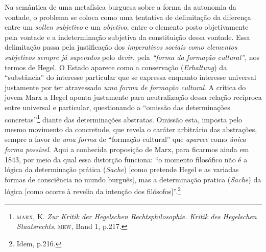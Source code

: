 Na semântica de uma metafísica burguesa sobre a forma da autonomia da
vontade, o problema se coloca como uma tentativa de delimitação da
diferença entre um \emph{sollen subjetivo} e um \emph{objetivo}, entre o
elemento posto objetivamente pela vontade e a indeterminação subjetiva
da constituição dessa vontade. Essa delimitação passa pela justificação
dos \emph{imperativos sociais como elementos subjetivos sempre já
superados} pelo \emph{devir}, pela \emph{``forma da formação
cultural''}, nos termos de Hegel. O Estado aparece como a conservação
(\emph{Erhaltung}) da ``substância'' do interesse particular que se
expressa enquanto interesse universal justamente por ter atravessado
\emph{uma} \emph{forma de formação cultural}. A crítica do jovem Marx a
Hegel aponta justamente para neutralização dessa relação recíproca entre
universal e particular, questionando a ``omissão das determinações
concretas''\footnote{\textsc{marx}, K. \emph{Zur Kritik der Hegelschen
  Rechtsphilosophie. Kritik des Hegelschen Staatsrechts}. \textsc{mew},
  Band 1, p.217.} diante das determinações abstratas. Omissão esta,
imposta pelo mesmo movimento da concretude, que revela o caráter
arbitrário das abstrações, sempre a favor de \emph{uma forma} de
``formação cultural'' que \emph{aparece} como \emph{única forma
possível}. Aqui a conhecida proposição de Marx, para ficarmos ainda em
1843, por meio da qual essa distorção funciona: ``o momento filosófico
não é a lógica da determinação prática (\emph{Sache}) {[}como pretende
Hegel e as variadas formas de consciência no mundo burguês{]}, mas a
determinação pratica (\emph{Sache}) da lógica {[}como ocorre à revelia
da intenção dos filósofos{]}''.\footnote{Idem, p.216.}

